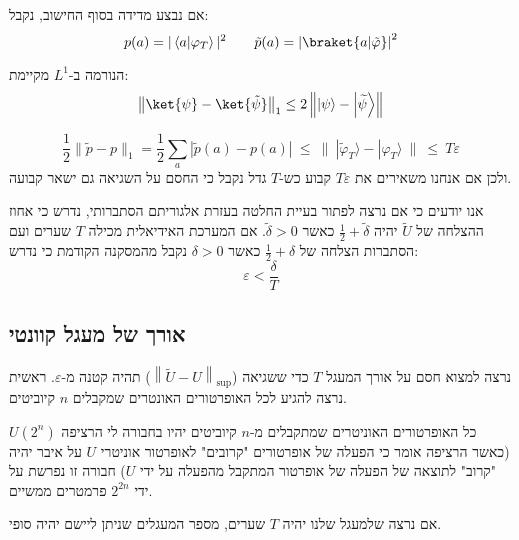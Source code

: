 \documentclass{tstextbook}
\begin{document}
\begin{proposition}
אם נבצע מדידה בסוף החישוב, נקבל:
$$p(a)=|\left\langle  a|\varphi_{T} \right\rangle|^{2}\qquad \tilde{p}(a)=\left\lvert  \braket{ a | \tilde{\varphi} }   \right\rvert ^{2}$$

\end{proposition}
\begin{proposition}
הנורמה ב-\(L^{1}\) מקיימת:
$$\left\lVert  \ket{\psi} -\ket{\tilde{\psi}}   \right\rVert _{1}\leq2\left\|\left|\psi\right\rangle-\left|\widetilde{\psi}\right\rangle\right\|$$

\end{proposition}
\begin{corollary}
$$\frac{1}{2}\|\tilde{p}-p\|_{1}=\frac{1}{2}\sum_{a}|\tilde{p}(a)-p(a)|~\leq~\|~|\tilde{\varphi}_{T}\rangle-|\varphi_{T}\rangle~\|~\leq~T\varepsilon$$
ולכן אם אנחנו משאירים את \(T\varepsilon\) קבוע כש-\(T\) גדל נקבל כי החסם על השגיאה גם ישאר קבועה.

\end{corollary}
\begin{corollary}
אנו יודעים כי אם נרצה לפתור בעיית החלטה בעזרת אלגוריתם הסתברותי, נדרש כי אחוז ההצלחה של \(\widetilde{U}\) יהיה \(\frac{1}{2}+\tilde{\delta}\) כאשר \(\tilde{\delta}>0\). אם המערכת האידיאלית מכילה \(T\) שערים ועם הסתברות הצלחה של \(\frac{1}{2}+\delta\) כאשר \(\delta> 0\) נקבל מהמסקנה הקודמת כי נדרש:
$$\varepsilon<\frac{\delta}{T}$$

\end{corollary}
\subsection{אורך של מעגל קוונטי}

נרצה למצוא חסם על אורך המעגל \(T\) כדי ששגיאה (\(\left\lVert  \tilde{U}  - U\right\rVert_{\sup}\)) תהיה קטנה מ-\(\varepsilon\).
ראשית נרצה להגיע לכל האופרטורים האונטרים שמקבלים \(n\) קיוביטים.

\begin{proposition}
כל האופרטורים האוניטרים שמתקבלים מ-\(n\) קיוביטים יהיו בחבורה לי הרציפה \(U(2^{n})\)(כאשר הרציפה אומר כי הפעלה של אופרטורים "קרובים" לאופרטור אוניטרי \(U\) על איבר יהיה "קרוב" לתוצאה של הפעלה של אופרטור המתקבל מהפעלה על ידי \(U\)) חבורה זו נפרשת על ידי \(2^{2n}\) פרמטרים ממשיים.

\end{proposition}
אם נרצה שלמעגל שלנו יהיה \(T\) שערים, מספר המעגלים שניתן ליישם יהיה סופי.
\end{document}
